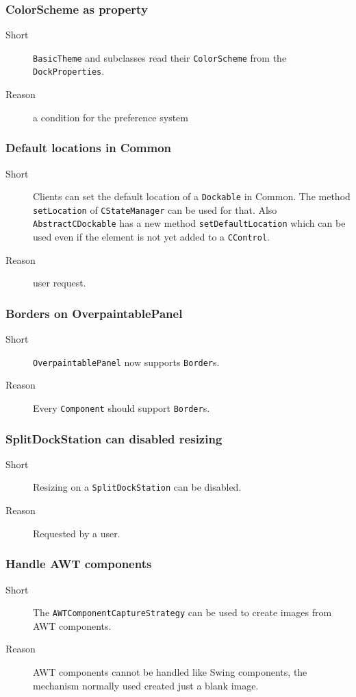 \documentclass[a4paper,10pt]{article}
\newcommand{\src}[1]{\lstinline[basicstyle=\normalsize\ttfamily,keywordstyle=\normalsize\ttfamily,identifierstyle=\normalsize\ttfamily]|#1|}
\newcommand{\short}{\item[Short]}
\newcommand{\why}{\item[Reason]}
\begin{document}
\subsubsection{ColorScheme as property}
\begin{description}
 \short \src{BasicTheme} and subclasses read their \src{ColorScheme} from the \\\src{DockProperties}.
 \why a condition for the preference system
\end{description}

\subsubsection{Default locations in Common}
\begin{description}
 \short Clients can set the default location of a \src{Dockable} in Common. The method \src{setLocation} of \src{CStateManager} can be used for that. Also \\\src{AbstractCDockable} has a new method \src{setDefaultLocation} which can be used even if the element is not yet added to a \src{CControl}.
 \why user request.
\end{description}

\subsubsection{Borders on OverpaintablePanel}
\begin{description}
 \short \src{OverpaintablePanel} now supports \src{Border}s.
 \why Every \src{Component} should support \src{Border}s.
\end{description}

\subsubsection{SplitDockStation can disabled resizing}
\begin{description}
 \short Resizing on a \src{SplitDockStation} can be disabled.
 \why Requested by a user.
\end{description}

\subsubsection{Handle AWT components}
\begin{description}
 \short The \src{AWTComponentCaptureStrategy} can be used to create images from AWT components.
 \why AWT components cannot be handled like Swing components, the \\mechanism normally used created just a blank image.
\end{description}
\end{document}
